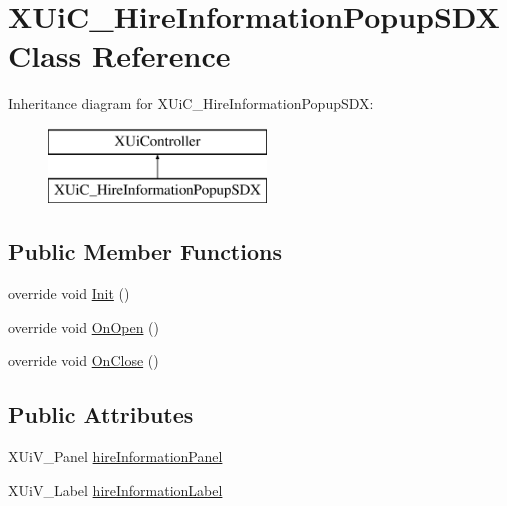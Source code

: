 \hypertarget{class_x_ui_c___hire_information_popup_s_d_x}{}\section{X\+Ui\+C\+\_\+\+Hire\+Information\+Popup\+S\+DX Class Reference}
\label{class_x_ui_c___hire_information_popup_s_d_x}
Inheritance diagram for X\+Ui\+C\+\_\+\+Hire\+Information\+Popup\+S\+DX\+:\begin{figure}[H]
\begin{center}
\leavevmode
\includegraphics[height=2.000000cm]{class_x_ui_c___hire_information_popup_s_d_x}
\end{center}
\end{figure}
\subsection*{Public Member Functions}
\begin{DoxyCompactItemize}
\item 
override void \mbox{\hyperlink{class_x_ui_c___hire_information_popup_s_d_x_ab8a280e23dab0b26daeb990b4ec11f2b}{Init}} ()
\item 
override void \mbox{\hyperlink{class_x_ui_c___hire_information_popup_s_d_x_a8d916a709f57066529f68cf4a56993aa}{On\+Open}} ()
\item 
override void \mbox{\hyperlink{class_x_ui_c___hire_information_popup_s_d_x_aa080efe2cac66ade321e5c8505e9d4ec}{On\+Close}} ()
\end{DoxyCompactItemize}
\subsection*{Public Attributes}
\begin{DoxyCompactItemize}
\item 
X\+Ui\+V\+\_\+\+Panel \mbox{\hyperlink{class_x_ui_c___hire_information_popup_s_d_x_a7999bc75d84227b4f299be112ed5cdb9}{hire\+Information\+Panel}}
\item 
X\+Ui\+V\+\_\+\+Label \mbox{\hyperlink{class_x_ui_c___hire_information_popup_s_d_x_a3763d717b8a7052ee37aaa0607c5f293}{hire\+Information\+Label}}
\end{DoxyCompactItemize}



